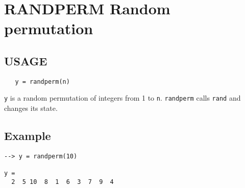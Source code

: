 \section{RANDPERM Random permutation}

\subsection{USAGE}

\begin{verbatim}
   y = randperm(n)
\end{verbatim}
\verb|y| is a random permutation of integers from 1 to \verb|n|.
\verb|randperm| calls \verb|rand| and changes its state.
\subsection{Example}

\begin{verbatim}
--> y = randperm(10)

y = 
  2  5 10  8  1  6  3  7  9  4 
\end{verbatim}
